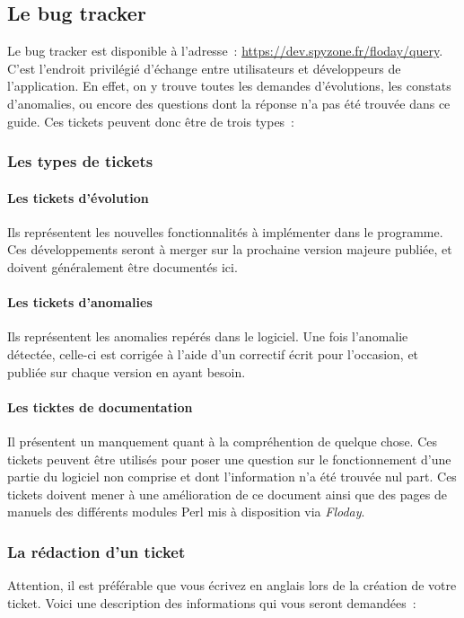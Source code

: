 \subsection{Le bug tracker}
\label{sec:contribution_bt}

Le bug tracker est disponible à l'adresse~: \url{https://dev.spyzone.fr/floday/query}.
C'est l'endroit privilégié d'échange entre utilisateurs et développeurs de l'application.
En effet, on y trouve toutes les demandes d'évolutions, les constats d'anomalies, ou encore des questions dont la réponse n'a pas été trouvée dans ce guide.
Ces tickets peuvent donc être de trois types~:

\subsubsection{Les types de tickets}
\paragraph{Les tickets d'évolution} Ils représentent les nouvelles fonctionnalités à implémenter dans le programme. Ces développements seront à merger sur la prochaine version majeure publiée, et doivent généralement être documentés ici.
\paragraph{Les tickets d'anomalies} Ils représentent les anomalies repérés dans le logiciel. Une fois l'anomalie détectée, celle-ci est corrigée à l'aide d'un correctif écrit pour l'occasion, et publiée sur chaque version en ayant besoin.
\paragraph{Les ticktes de documentation} Il présentent un manquement quant à la compréhention de quelque chose. Ces tickets peuvent être utilisés pour poser une question sur le fonctionnement d'une partie du logiciel non comprise et dont l'information n'a été trouvée nul part. Ces tickets doivent mener à une amélioration de ce document ainsi que des pages de manuels des différents modules Perl mis à disposition via \emph{Floday}.

\subsubsection{La rédaction d'un ticket}
Attention, il est préférable que vous écrivez en anglais lors de la création de votre ticket.
Voici une description des informations qui vous seront demandées~:
\newline


